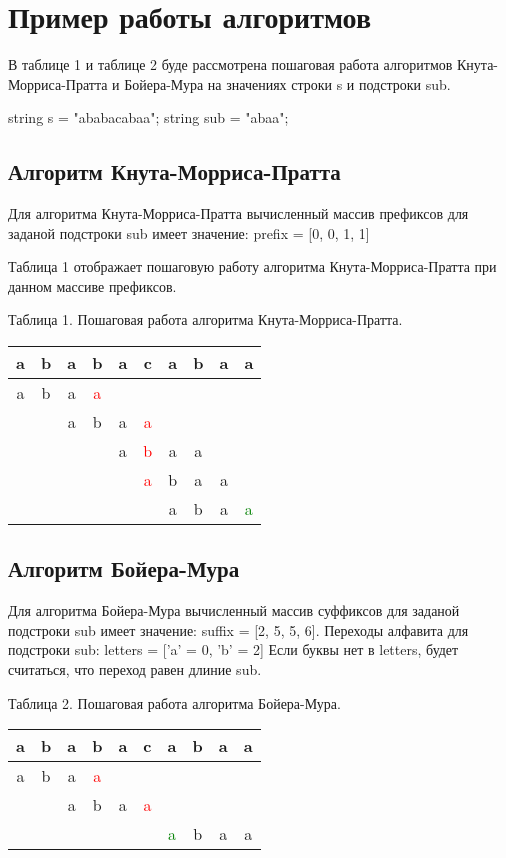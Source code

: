 \documentclass[12pt]{report}
\begin{document}
\section{Пример работы алгоритмов}
В таблице 1 и таблице 2 буде рассмотрена пошаговая работа алгоритмов Кнута-Морриса-Пратта и Бойера-Мура на значениях строки s и подстроки sub.  

string s = "ababacabaa";  
string sub = "abaa";   

\subsection{Алгоритм Кнута-Морриса-Пратта}
Для алгоритма Кнута-Морриса-Пратта вычисленный массив префиксов для заданой  подстроки sub имеет значение:
prefix = [0, 0, 1, 1]

Таблица 1 отображает пошаговую работу алгоритма Кнута-Морриса-Пратта при данном массиве префиксов.
 
\begin{center}
Таблица 1. Пошаговая работа алгоритма Кнута-Морриса-Пратта.\\

\begin{tabular}{| c | c | c | c | c | c | c | c | c | c | }
	\hline
	a&b&a&b&a&c&a&b&a&a \\
	\hline
	\hline
	a&b&a&\textcolor{red}{a}&&&&&&\\
	\hline
	&&a&b&a&\textcolor{red}{a}&&&&\\
	\hline
	&&&&a&\textcolor{red}{b}&a&a&&\\
	\hline
	&&&&&\textcolor{red}{a}&b&a&a&\\
	\hline
	&&&&&&a&b&a&\textcolor{green}{a}\\
	\hline

	
\end{tabular}
\end{center}

\subsection{Алгоритм Бойера-Мура}
Для алгоритма Бойера-Мура вычисленный массив суффиксов для заданой  подстроки sub имеет значение:
suffix = [2, 5, 5, 6].
Переходы алфавита для подстроки sub:
letters = ['a' = 0, 'b' = 2]   
Если буквы нет в letters, будет считаться, что переход равен длиние sub.

\begin{center}
Таблица 2. Пошаговая работа алгоритма Бойера-Мура.\\

\begin{tabular}{| c | c | c | c | c | c | c | c | c | c | }
	\hline
	a&b&a&b&a&c&a&b&a&a \\
	\hline
	\hline
	a&b&a&\textcolor{red}{a}&&&&&&\\
	\hline
	&&a&b&a&\textcolor{red}{a}&&&&\\
	\hline
	&&&&&&\textcolor{green}{a}&b&a&a\\
	\hline

	
\end{tabular}
\end{center}
\end{document}
